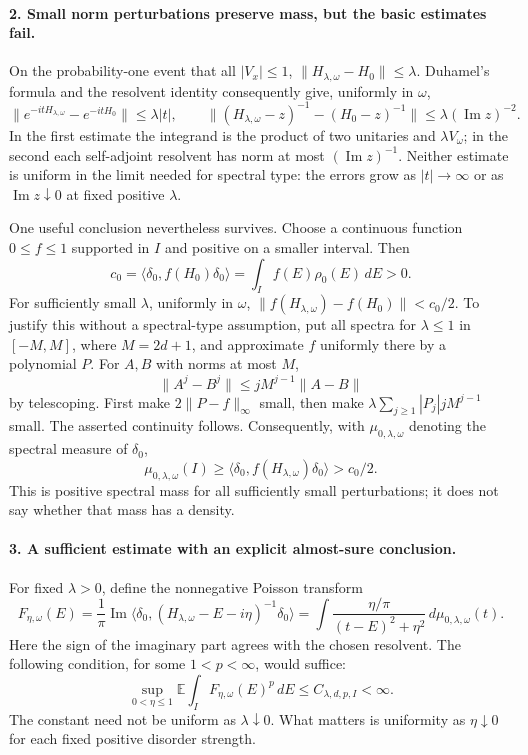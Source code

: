 \documentclass[11pt]{article}
\begin{document}
\paragraph{2. Small norm perturbations preserve mass, but the basic estimates fail.}
On the probability-one event that all $|V_x|\leq1$,
$\|H_{\lambda,\omega}-H_0\|\leq\lambda$. Duhamel's formula and the
resolvent identity consequently give, uniformly in $\omega$,
\[
 \|e^{-itH_{\lambda,\omega}}-e^{-itH_0}\|\leq\lambda|t|,
 \qquad
 \|(H_{\lambda,\omega}-z)^{-1}-(H_0-z)^{-1}\|
       \leq\lambda(\operatorname{Im}z)^{-2}.
 \tag{31.4}
\]
In the first estimate the integrand is the product of two unitaries and
$\lambda V_\omega$; in the second each self-adjoint resolvent has norm at
most $(\operatorname{Im}z)^{-1}$. Neither estimate is uniform in the limit
needed for spectral type: the errors grow as $|t|\to\infty$ or as
$\operatorname{Im}z\downarrow0$ at fixed positive $\lambda$.

One useful conclusion nevertheless survives. Choose a continuous function
$0\leq f\leq1$ supported in $I$ and positive on a smaller interval. Then
\[
 c_0=\langle\delta_0,f(H_0)\delta_0\rangle
      =\int_I f(E)\rho_0(E)\,dE>0.
\]
For sufficiently small $\lambda$, uniformly in $\omega$,
$\|f(H_{\lambda,\omega})-f(H_0)\|<c_0/2$. To justify this without a
spectral-type assumption, put all spectra for $\lambda\leq1$ in
$[-M,M]$, where $M=2d+1$, and approximate $f$ uniformly there by a
polynomial $P$. For $A,B$ with norms at most $M$,
\[
 \|A^j-B^j\|\leq jM^{j-1}\|A-B\|
\]
by telescoping. First make $2\|P-f\|_\infty$ small, then make
$\lambda\sum_{j\geq1}|P_j|jM^{j-1}$ small. The asserted continuity
follows. Consequently, with $\mu_{0,\lambda,\omega}$ denoting the spectral
measure of $\delta_0$,
\[
 \mu_{0,\lambda,\omega}(I)
 \geq\langle\delta_0,f(H_{\lambda,\omega})\delta_0\rangle
 >c_0/2.
 \tag{31.5}
\]
This is positive spectral mass for all sufficiently small perturbations;
it does not say whether that mass has a density.

\paragraph{3. A sufficient estimate with an explicit almost-sure conclusion.}
For fixed $\lambda>0$, define the nonnegative Poisson transform
\[
 F_{\eta,\omega}(E)=\frac1\pi
   \operatorname{Im}\langle\delta_0,
       (H_{\lambda,\omega}-E-i\eta)^{-1}\delta_0\rangle
 =\int\frac{\eta/\pi}{(t-E)^2+\eta^2}
       \,d\mu_{0,\lambda,\omega}(t).
 \tag{31.6}
\]
Here the sign of the imaginary part agrees with the chosen resolvent.
The following condition, for some $1<p<\infty$, would suffice:
\[
 \sup_{0<\eta\leq1}\mathbb E
       \int_I F_{\eta,\omega}(E)^p\,dE
       \leq C_{\lambda,d,p,I}<\infty.
 \tag{31.7}
\]
The constant need not be uniform as $\lambda\downarrow0$. What matters is
uniformity as $\eta\downarrow0$ for each fixed positive disorder strength.
\end{document}
